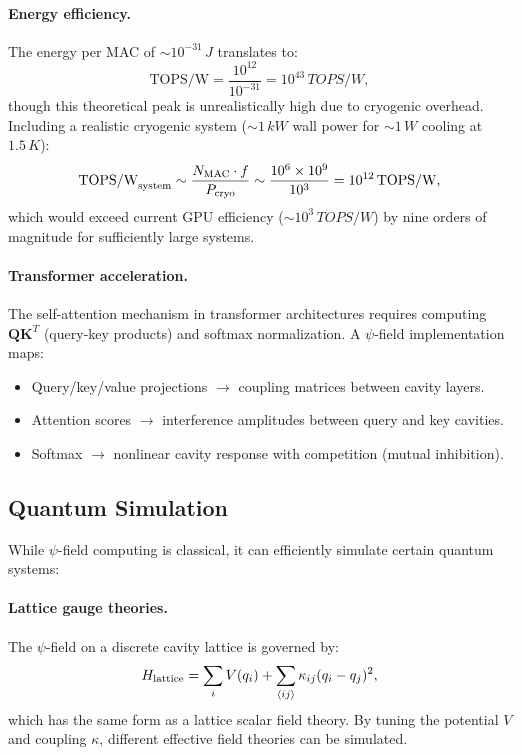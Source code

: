\documentclass[12pt,a4paper,twoside]{article}
\begin{document}
\paragraph{Energy efficiency.} The energy per MAC of $\sim 10^{-31}\,\si{J}$ translates to:
\begin{equation}
\text{TOPS/W} = \frac{10^{12}}{10^{-31}} = 10^{43}\,\si{TOPS/W},
\end{equation}
though this theoretical peak is unrealistically high due to cryogenic overhead. Including a realistic cryogenic system ($\sim 1\,\si{kW}$ wall power for $\sim 1\,\si{W}$ cooling at $1.5\,\si{K}$):
\begin{equation}
\text{TOPS/W}_{\rm system} \sim \frac{N_{\rm MAC} \cdot f}{P_{\rm cryo}} \sim \frac{10^6 \times 10^9}{10^3} = 10^{12}\,\si{TOPS/W},
\end{equation}
which would exceed current GPU efficiency ($\sim 10^3\,\si{TOPS/W}$) by nine orders of magnitude for sufficiently large systems.

\paragraph{Transformer acceleration.} The self-attention mechanism in transformer architectures requires computing $\mathbf{Q}\mathbf{K}^T$ (query-key products) and softmax normalization. A $\psi$-field implementation maps:
\begin{itemize}
\item Query/key/value projections $\to$ coupling matrices between cavity layers.
\item Attention scores $\to$ interference amplitudes between query and key cavities.
\item Softmax $\to$ nonlinear cavity response with competition (mutual inhibition).
\end{itemize}

\subsection{Quantum Simulation}\label{sec:quantum_sim}

While $\psi$-field computing is classical, it can efficiently simulate certain quantum systems:

\paragraph{Lattice gauge theories.} The $\psi$-field on a discrete cavity lattice is governed by:
\begin{equation}
H_{\rm lattice} = \sum_i V(q_i) + \sum_{\langle ij \rangle} \kappa_{ij}(q_i - q_j)^2,
\end{equation}
which has the same form as a lattice scalar field theory. By tuning the potential $V$ and coupling $\kappa$, different effective field theories can be simulated.
\end{document}
